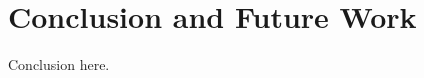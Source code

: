 \documentclass[thesis.tex]{subfiles}
\begin{document}
\chapter{Conclusion and Future Work}
\label{cha:concl-future-work}

Conclusion here.
\end{document}

